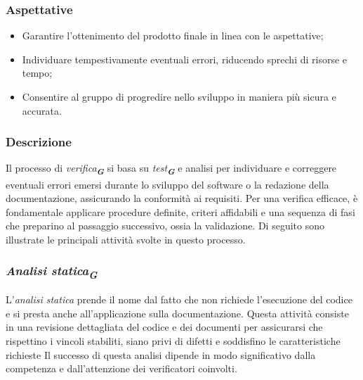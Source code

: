 \subsubsection{Aspettative}
\begin{itemize}
    \item Garantire l'ottenimento del prodotto finale in linea con le aspettative;
    \item Individuare tempestivamente eventuali errori, riducendo sprechi di risorse e tempo;
    \item Consentire al gruppo di progredire nello sviluppo in maniera più sicura e accurata.
\end{itemize}

\subsubsection{Descrizione}
Il processo di \emph{verifica}\textsubscript{\textit{\textbf{G}}} si basa su \emph{test}\textsubscript{\textit{\textbf{G}}} e analisi per individuare e correggere eventuali errori emersi durante lo sviluppo del software o la redazione della documentazione, assicurando la conformità ai requisiti. Per una verifica efficace, è fondamentale applicare procedure definite, criteri affidabili e una sequenza di fasi che preparino al passaggio successivo, ossia la validazione. Di seguito sono illustrate le principali attività svolte in questo processo.

\subsubsection{\emph{Analisi statica}\textsubscript{\textit{\textbf{G}}}}
L’\emph{analisi statica} prende il nome dal fatto che non richiede l’esecuzione del codice e si presta anche all’applicazione sulla documentazione. Questa attività consiste in una revisione dettagliata del codice e dei documenti per assicurarsi che rispettino i vincoli stabiliti, siano privi di difetti e soddisfino le caratteristiche richieste
Il successo di questa analisi dipende in modo significativo dalla competenza e dall’attenzione dei verificatori coinvolti.

